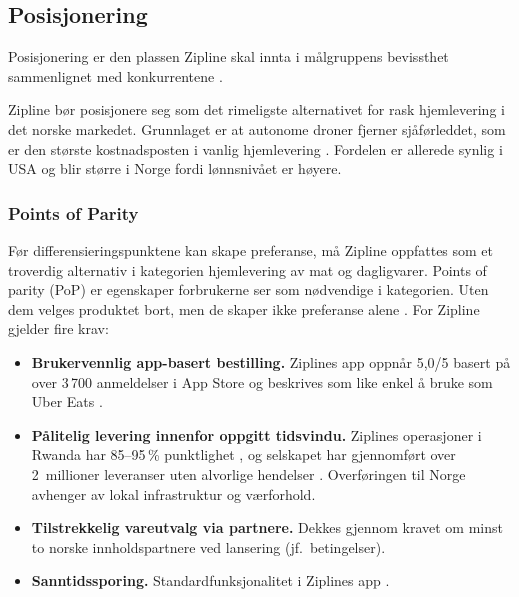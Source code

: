 \subsection{Posisjonering}
\label{subsec:posisjonering}

Posisjonering er den plassen Zipline skal innta i målgruppens bevissthet
sammenlignet med konkurrentene \parencite[301]{kotlerkeller2016}.

Zipline bør posisjonere seg som det rimeligste alternativet for rask
hjemlevering i det norske markedet. Grunnlaget er at autonome droner fjerner
sjåførleddet, som er den største kostnadsposten i vanlig hjemlevering
\parencite{capgemini2019_lastmile}.
Fordelen er allerede synlig i USA og blir større i Norge fordi lønnsnivået
er høyere.

\subsubsection{Points of Parity}

Før differensieringspunktene kan skape preferanse, må Zipline oppfattes som
et troverdig alternativ i kategorien hjemlevering av mat og dagligvarer.
Points of parity (PoP) er egenskaper forbrukerne ser som nødvendige i
kategorien. Uten dem velges produktet bort, men de skaper ikke preferanse
alene \parencite[302]{kotlerkeller2016}. For Zipline gjelder fire krav:

\begin{itemize}[leftmargin=2em]
  \item \textbf{Brukervennlig app-basert bestilling.} Ziplines app oppnår
    5,0/5 basert på over 3\,700 anmeldelser i App Store og beskrives som
    like enkel å bruke som Uber Eats \parencite{stevens2025}.
  \item \textbf{Pålitelig levering innenfor oppgitt tidsvindu.} Ziplines
    operasjoner i Rwanda har 85--95\,\% punktlighet
    \parencite{logisticsnavigators2026}, og selskapet har gjennomført over
    2~millioner leveranser uten alvorlige hendelser \parencite{dronexl2026}.
    Overføringen til Norge avhenger av lokal infrastruktur og værforhold.
  \item \textbf{Tilstrekkelig vareutvalg via partnere.} Dekkes gjennom
    kravet om minst to norske innholdspartnere ved lansering (jf.\
    betingelser).
  \item \textbf{Sanntidssporing.} Standardfunksjonalitet i Ziplines app
    \parencite{stevens2025}.
\end{itemize}

